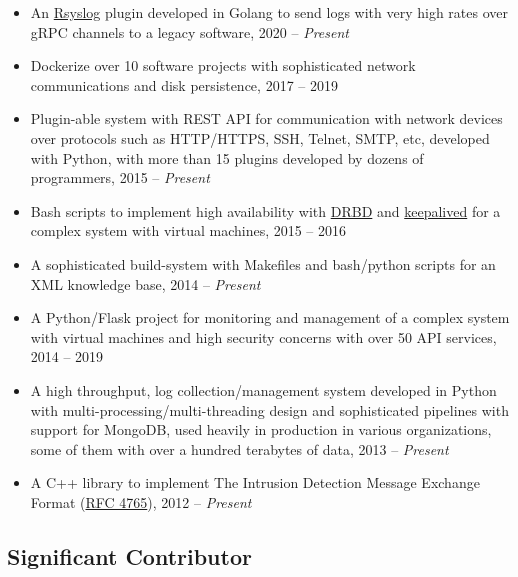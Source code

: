 \documentclass[10pt]{scrartcl}
\begin{document}
\begin{itemize}
\item An \href{https://www.rsyslog.com/}{Rsyslog} plugin developed in Golang to send logs with very high
rates over gRPC channels to a legacy software, 2020 -- \emph{Present}

\item Dockerize over 10 software projects with sophisticated network
communications and disk persistence, 2017 -- 2019

\item Plugin-able system with REST API for communication with network
devices over protocols such as HTTP/HTTPS, SSH, Telnet, SMTP, etc,
developed with Python, with more than 15 plugins developed
by dozens of programmers, 2015 -- \emph{Present}

\item Bash scripts to implement high availability with \href{https://www.linbit.com/drbd/}{DRBD} and \href{https://github.com/acassen/keepalived}{keepalived}
for a complex system with virtual machines, 2015 -- 2016

\item A sophisticated build-system with Makefiles and bash/python scripts
for an XML knowledge base, 2014 -- \emph{Present}

\item A Python/Flask project for monitoring and management of a complex
system with virtual machines and high security concerns with over 50
API services, 2014 -- 2019

\item A high throughput, log collection/management system developed in
Python with multi-processing/multi-threading design and
sophisticated pipelines with support for MongoDB, used heavily in
production in various organizations, some of them with over a
hundred terabytes of data, 2013 -- \emph{Present}

\item A C++ library to implement The Intrusion Detection Message Exchange
Format (\href{https://tools.ietf.org/html/rfc4765}{RFC 4765}), 2012 -- \emph{Present}
\end{itemize}

\subsection*{Significant Contributor}
\label{sec:org8ea78ef}
\end{document}
